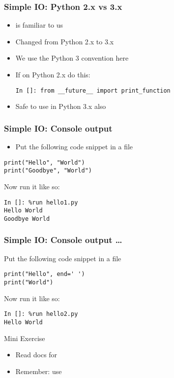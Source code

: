 \documentclass[14pt,compress]{beamer}
\begin{document}
\begin{frame}[fragile]
  \frametitle{Simple IO: Python 2.x vs 3.x}
  \begin{itemize}
  \item {} is familiar to us
  \item Changed from Python 2.x to 3.x
  \item We use the Python 3 convention here
    \vspace*{2em}
  \item If on Python 2.x do this:
  {
    \small
\begin{lstlisting}
In []: from __future__ import print_function
\end{lstlisting}
  }
  \item Safe to use in Python 3.x also
  \end{itemize}
\end{frame}

\begin{frame}[fragile]
  \frametitle{Simple IO: Console output}
  \begin{itemize}
  \item Put the following code snippet in a file 
  \end{itemize}
  \begin{lstlisting}
print("Hello", "World")
print("Goodbye", "World")
\end{lstlisting}
Now run it like so:
\begin{lstlisting}
In []: %run hello1.py
Hello World
Goodbye World
  \end{lstlisting}
\end{frame}

\begin{frame}[fragile]
  \frametitle{Simple IO: Console output \ldots}
Put the following code snippet in a file 
  \begin{lstlisting}
print("Hello", end=' ')
print("World")
\end{lstlisting}
Now run it like so:
\begin{lstlisting}
In []: %run hello2.py
Hello World
  \end{lstlisting}

\pause

\begin{block}{Mini Exercise}
  \begin{itemize}
  \item Read docs for 
  \item Remember: use  \
  \end{itemize}
\end{block}
\end{frame}
\end{document}
